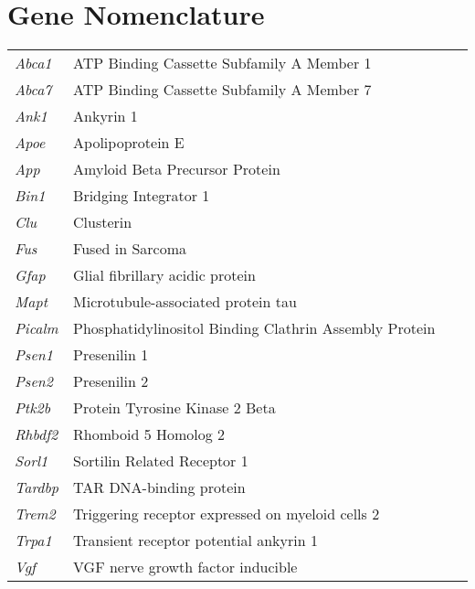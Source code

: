 \chapter*{Gene Nomenclature}

\setlength{\tabcolsep}{12pt}
\begin{tabular}{l p{1.5\linewidth}}
\textit{Abca1}& ATP Binding Cassette Subfamily A Member 1 \\
\textit{Abca7}&  ATP Binding Cassette Subfamily A Member 7 \\
\textit{Ank1} & Ankyrin 1\\
\textit{Apoe}&  Apolipoprotein E \\
\textit{App}& Amyloid Beta Precursor Protein \\
\textit{Bin1}&Bridging Integrator 1 \\
\textit{Clu}&Clusterin \\
\textit{Fus}&Fused in Sarcoma \\
\textit{Gfap}&Glial fibrillary acidic protein\\
\textit{Mapt}&Microtubule-associated protein tau \\
\textit{Picalm}&Phosphatidylinositol Binding Clathrin Assembly Protein \\
\textit{Psen1}&Presenilin 1 \\
\textit{Psen2}&Presenilin 2 \\
\textit{Ptk2b}&Protein Tyrosine Kinase 2 Beta \\
\textit{Rhbdf2}&Rhomboid 5 Homolog 2 \\
\textit{Sorl1}&Sortilin Related Receptor 1 \\
\textit{Tardbp}& TAR DNA-binding protein \\
\textit{Trem2}&Triggering receptor expressed on myeloid cells 2 \\
\textit{Trpa1}&Transient receptor potential ankyrin 1 \\
\textit{Vgf}&VGF nerve growth factor inducible \\
\end{tabular}


